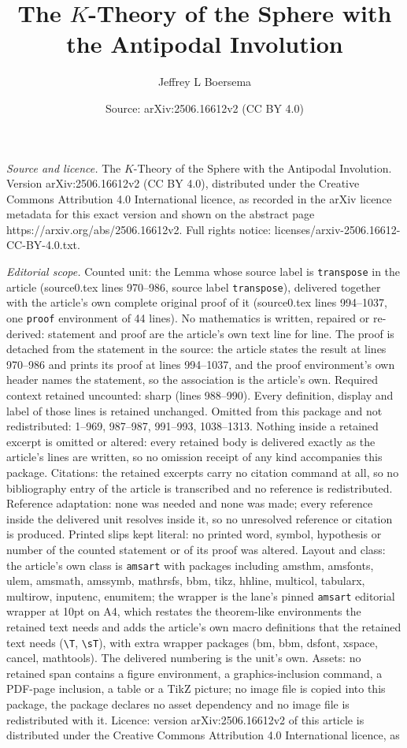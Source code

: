 \documentclass[10pt,a4paper]{amsart}
\title[The $K$-Theory of the Sphere with the Antipodal Involution]{The $K$-Theory of the Sphere with the Antipodal Involution}
\author{Jeffrey L Boersema}
\date{Source: arXiv:2506.16612v2 (CC BY 4.0)}
\begin{document}
\maketitle

\noindent\emph{Source and licence.} The $K$-Theory of the Sphere with the Antipodal Involution. Version arXiv:2506.16612v2 (CC BY 4.0), distributed under the Creative Commons Attribution 4.0 International licence, as recorded in the arXiv licence metadata for this exact version and shown on the abstract page https://arxiv.org/abs/2506.16612v2. Full rights notice: licenses/arxiv-2506.16612-CC-BY-4.0.txt.\par\smallskip

\noindent\textit{Editorial scope.} Counted unit: the Lemma whose source label is \texttt{transpose} in the article (source0.tex lines 970--986, source label \texttt{transpose}), delivered together with the article's own complete original proof of it (source0.tex lines 994--1037, one \texttt{proof} environment of 44 lines). No mathematics is written, repaired or re-derived: statement and proof are the article's own text line for line. The proof is detached from the statement in the source: the article states the result at lines 970--986 and prints its proof at lines 994--1037, and the proof environment's own header names the statement, so the association is the article's own. Required context retained uncounted: sharp (lines 988--990). Every definition, display and label of those lines is retained unchanged. Omitted from this package and not redistributed: 1--969, 987--987, 991--993, 1038--1313. Nothing inside a retained excerpt is omitted or altered: every retained body is delivered exactly as the article's lines are written, so no omission receipt of any kind accompanies this package. Citations: the retained excerpts carry no citation command at all, so no bibliography entry of the article is transcribed and no reference is redistributed. Reference adaptation: none was needed and none was made; every reference inside the delivered unit resolves inside it, so no unresolved reference or citation is produced. Printed slips kept literal: no printed word, symbol, hypothesis or number of the counted statement or of its proof was altered. Layout and class: the article's own class is \texttt{amsart} with packages including amsthm, amsfonts, ulem, amsmath, amssymb, mathrsfs, bbm, tikz, hhline, multicol, tabularx, multirow, inputenc, enumitem; the wrapper is the lane's pinned \texttt{amsart} editorial wrapper at 10pt on A4, which restates the theorem-like environments the retained text needs and adds the article's own macro definitions that the retained text needs (\texttt{\textbackslash T}, \texttt{\textbackslash sT}), with extra wrapper packages (bm, bbm, dsfont, xspace, cancel, mathtools). The delivered numbering is the unit's own. Assets: no retained span contains a figure environment, a graphics-inclusion command, a PDF-page inclusion, a table or a TikZ picture; no image file is copied into this package, the package declares no asset dependency and no image file is redistributed with it. Licence: version arXiv:2506.16612v2 of this article is distributed under the Creative Commons Attribution 4.0 International licence, as 
\end{document}
